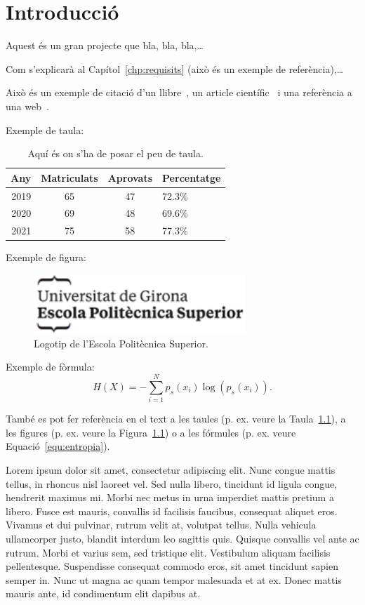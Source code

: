 \documentclass[a4paper,12pt,twoside]{ThesisStyle}
\begin{document}
\chapter{Introducció}
\label{chp:intro}

Aquest és un gran projecte que bla, bla, bla,\ldots

Com s'explicarà al Capítol~\ref{chp:requisits} (això és un exemple de referència),\ldots

Això és un exemple de citació d'un llibre~\cite{Garrison2011A}, un article científic~\cite{Ruiz2011A} i una referència a una web~\cite{EuropeanCommission2020A}.

Exemple de taula:
\begin{table}[htb]
  \centering
  \begin{tabular}{ | r | c | c | l | }
    \hline
    Any & Matriculats & Aprovats & Percentatge\\
    \hline
    2019  & 65 & 47 & 72.3\%\\
    2020  & 69 & 48 & 69.6\%\\
    2021  & 75 & 58 & 77.3\%\\
    \hline
  \end{tabular}
  \caption[Llegenda taula només per l'índex de taules]{\label{tab:taulaexemple} Aquí és on s'ha de posar el peu de taula. }
\end{table}

Exemple de figura:
\begin{figure}[htb]
  \centering
  \includegraphics[width=8cm]{imatges/logo_eps.png}
  \caption[Llegenda figura només per l'índex de figures]{\label{fig:logo} Logotip de l'Escola Politècnica Superior.}
\end{figure}

Exemple de fòrmula:
\begin{equation}
  H(X) = -\sum_{i=1}^{N}p_s(x_i) \log \left( p_s(x_i) \right).
  \label{equ:entropia}
\end{equation}


També es pot fer referència en el text a les taules (p. ex. veure la Taula~\ref{tab:taulaexemple}), a les figures (p. ex. veure la Figura~\ref{fig:logo}) o a les fórmules (p. ex. veure Equació~\ref{equ:entropia}).

Lorem ipsum dolor sit amet, consectetur adipiscing elit. Nunc congue mattis tellus, in rhoncus nisl laoreet vel. Sed nulla libero, tincidunt id ligula congue, hendrerit maximus mi. Morbi nec metus in urna imperdiet mattis pretium a libero. Fusce est mauris, convallis id facilisis faucibus, consequat aliquet eros. Vivamus et dui pulvinar, rutrum velit at, volutpat tellus. Nulla vehicula ullamcorper justo, blandit interdum leo sagittis quis. Quisque convallis vel ante ac rutrum. Morbi et varius sem, sed tristique elit. Vestibulum aliquam facilisis pellentesque. Suspendisse consequat commodo eros, sit amet tincidunt sapien semper in. Nunc ut magna ac quam tempor malesuada et at ex. Donec mattis mauris ante, id condimentum elit dapibus at.
\end{document}
